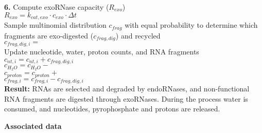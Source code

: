 \documentclass[12pt]{article}
\begin{document}
{\begin{algorithm}[H]
\vspace{12pt}
\textbf{6.} Compute exoRNase capacity ($R_{exo}$)\\
    \-\hspace{1cm} $R_{exo} = k_{cat,exo} \cdot c_{exo} \cdot \Delta t$\\
    {
      Sample multinomial distribution $c_{frag}$ with equal probability to determine which fragments are exo-digested ($c_{frag,dig}$) and recycled\\
        \-\hspace{1cm} $c_{frag,dig,i} =$ \\
        Update nucleotide, water, proton counts, and RNA fragments\\
      \-\hspace{1cm} $c_{nt,i} = c_{nt,i} + c_{frag,dig,i}$\\
        \-\hspace{1cm} $c_{H_2O} = c_{H_2O} - $ \\
        \-\hspace{1cm} $c_{proton} = c_{proton} + $ \\
        \-\hspace{1cm} $c_{frag,i} = c_{frag,i} - c_{frag,dig,i}$\\
    }
    \textbf{Result:} RNAs are selected and degraded by endoRNases, and non-functional RNA fragments are digested through exoRNases. During the process water is consumed, and nucleotides, pyrophosphate and protons are released.

\end{algorithm}
}
\newpage

\textbf{Associated data}
\end{document}
